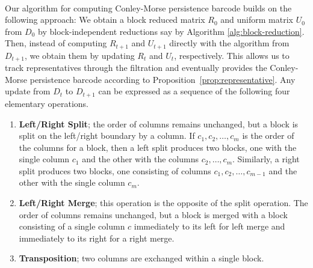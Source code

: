 \documentclass[letterpaper,11pt]{article}
\theoremstyle{plain}
\theoremstyle{definition}
\def\cB{\text{$\mathcal B$}}
\newcounter{li}
\newcommand{\BD}{\cB}
\begin{document}
~\\
Our algorithm for computing Conley-Morse persistence barcode builds on the following approach:
	 We obtain a block
    reduced matrix $R_0$ and uniform matrix $U_0$ from $D_0$ by block-independent reductions say by Algorithm
\ref{alg:block-reduction}.
	Then, instead of computing $R_{t+1}$ and $U_{t+1}$ directly with the algorithm from $D_{t+1}$, we obtain them by updating $R_t$ and $U_t$, respectively.
This allows us to track representatives through the filtration and eventually provides the Conley-Morse persistence barcode according to Proposition~\ref{prop:representative}. 
Any update from $D_t$ to $D_{t+1}$ can be expressed as a sequence of the following four elementary operations.

\begin{enumerate}[label=(\arabic*)]
    \item \textbf{Left/Right Split}; the order of columns remains unchanged, but a block is split on the 
    left/right boundary by a column. 
    If $c_1,c_2,\ldots, c_m$ is the order of the columns for a block, then 
       a left split produces two blocks, 
        one with the single column $c_1$
        and the other with the columns $c_2,\ldots, c_m$. 
    Similarly, 
    a right split produces two blocks, one consisting of columns $c_1,c_2,\ldots, c_{m-1}$ and the other with the single column $c_m$. 
    
    \item \textbf{Left/Right Merge}; this operation is the opposite of the split operation. 
        The order of columns remains unchanged, but a block is merged with a block consisting
        of a single column $c$ immediately to its left for left merge and
        immediately to its right for a right merge.
    \item \textbf{Transposition}; two columns are exchanged within a single block.
\end{enumerate}
\end{document}
